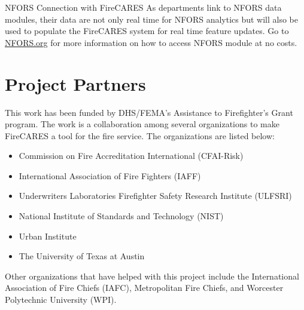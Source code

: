 \documentclass[12pt,oneside]{book}
\begin{document}
NFORS Connection with FireCARES
As departments link to NFORS data modules, their data are not only real time for NFORS analytics but will also be used to populate the FireCARES system for real time feature updates. Go to \href{https://nfors.org}{NFORS.org} for more information on how to access NFORS module at no costs.

\chapter{Project Partners}

This work has been funded by DHS/FEMA's Assistance to Firefighter's Grant program. The work is a collaboration among several organizations to make FireCARES a tool for the fire service. The organizations are listed below:

\begin{itemize}
\item Commission on Fire Accreditation International (CFAI-Risk)
\item International Association of Fire Fighters (IAFF)
\item Underwriters Laboratories Firefighter Safety Research Institute (ULFSRI)
\item National Institute of Standards and Technology (NIST)
\item Urban Institute
\item The University of Texas at Austin
\end{itemize}

Other organizations that have helped with this project include the International Association of Fire Chiefs (IAFC), Metropolitan Fire Chiefs, and Worcester Polytechnic University (WPI).
\end{document}
